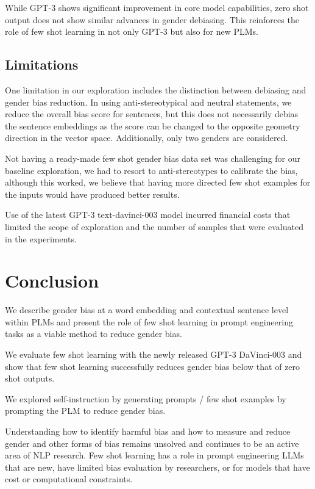 \documentclass[11pt]{article}
\begin{document}
While GPT-3 shows significant improvement in core model capabilities, zero shot output does not show similar advances in gender debiasing. This reinforces the role of few shot learning in not only GPT-3 but also for new PLMs.

\subsection{Limitations}

One limitation in our exploration includes the distinction between debiasing and gender bias reduction. In using anti-stereotypical and neutral statements, we reduce the overall bias score for sentences, but this does not necessarily debias the sentence embeddings as the score can be changed to the opposite geometry direction in the vector space. Additionally, only two genders are considered.

Not having a ready-made few shot gender bias data set was challenging for our baseline exploration, we had to resort to anti-stereotypes to calibrate the bias, although this worked, we believe that having more directed few shot examples for the inputs would have produced better results. 

Use of the latest GPT-3 text-davinci-003 model incurred financial costs that limited the scope of exploration and the number of samples that were evaluated in the experiments.

\section{Conclusion}
We describe gender bias at a word embedding and contextual sentence level within PLMs and present the role of few shot learning in prompt engineering tasks as a viable method to reduce gender bias. 

We evaluate few shot learning with the newly released GPT-3 DaVinci-003 and show that few shot learning successfully reduces gender bias below that of zero shot outputs.

We explored self-instruction by generating prompts / few shot examples by prompting the PLM to reduce gender bias.

Understanding how to identify harmful bias and how to measure and reduce gender and other forms of bias remains unsolved and continues to be an active area of NLP research. Few shot learning has a role in prompt engineering LLMs that are new, have limited bias evaluation by researchers, or for models that have cost or computational constraints. 
\end{document}
